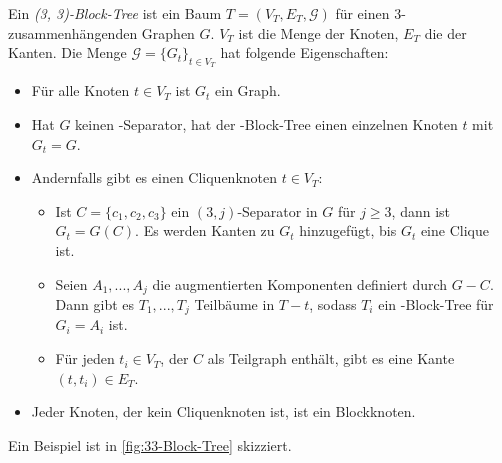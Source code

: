 \begin{definition}
Ein \emph{(3, 3)-Block-Tree} ist ein Baum $T = (V_T, E_T, \mathcal{G})$ für einen $3$-zusammenhängenden Graphen $G$.
$V_T$ ist die Menge der Knoten, $E_T$ die der Kanten.
Die Menge $\mathcal{G} = \{G_t\}_{t \in V_T}$ hat folgende Eigenschaften:
\begin{itemize}
  \item Für alle Knoten $t \in V_T$ ist $G_t$ ein Graph.
  \item Hat $G$ keinen \dd-Separator, hat der \dd-Block-Tree einen einzelnen Knoten $t$ mit $G_t = G$.
  \item Andernfalls gibt es einen Cliquenknoten $t \in V_T$:
  \begin{itemize}
    \item Ist $C = \{c_1, c_2, c_3\}$ ein $(3, j)$-Separator in $G$ für $j \geq 3$, dann ist $G_t = G(C)$.
          Es werden Kanten zu $G_t$ hinzugefügt, bis $G_t$ eine Clique ist.
    \item Seien $A_1, ..., A_j$ die augmentierten Komponenten definiert durch $G - C$.
          Dann gibt es $T_1, ..., T_j$ Teilbäume in $T - t$, sodass $T_i$ ein \dd-Block-Tree für $G_i = A_i$ ist.
    \item Für jeden $t_i \in V_T$, der $C$ als Teilgraph enthält, gibt es eine Kante $(t, t_i) \in E_T$.
  \end{itemize}
  \item Jeder Knoten, der kein Cliquenknoten ist, ist ein Blockknoten.
\end{itemize}
\end{definition}

Ein Beispiel ist in \Abb \ref{fig:33-Block-Tree} skizziert.

\newpage

